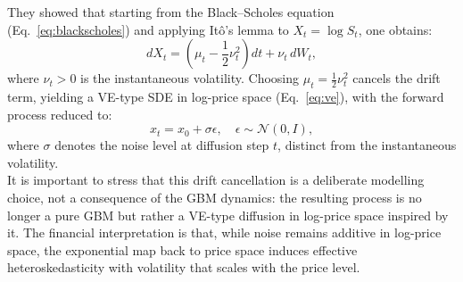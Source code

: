 They showed that starting from the Black--Scholes equation (Eq.~\ref{eq:blackscholes}) and 
applying It\^{o}'s lemma to \(X_t = \log S_t\), one obtains:
\[
    dX_t = \left(\mu_t - \frac{1}{2}\nu_t^2\right)dt + \nu_t\,dW_t,
\]
where \(\nu_t > 0\) is the instantaneous volatility. Choosing 
\(\mu_t = \frac{1}{2}\nu_t^2\) cancels the drift term, yielding a 
VE-type SDE in log-price space (Eq.~\ref{eq:ve}), with the forward 
process reduced to:
\begin{equation}
    \label{eq:forward_ve}
    x_t = x_0 + \sigma\epsilon, \quad \epsilon \sim \mathcal{N}(0, I),
\end{equation}
where \(\sigma\) denotes the noise level at diffusion step \(t\), 
distinct from the instantaneous volatility.\\

It is important to stress that this drift cancellation is a deliberate 
modelling choice, not a consequence of the GBM dynamics: the resulting 
process is no longer a pure GBM but rather a VE-type diffusion in 
log-price space inspired by it. The financial interpretation is that, 
while noise remains additive in log-price space, the exponential map back to price space induces effective heteroskedasticity with volatility that scales with the price level.

